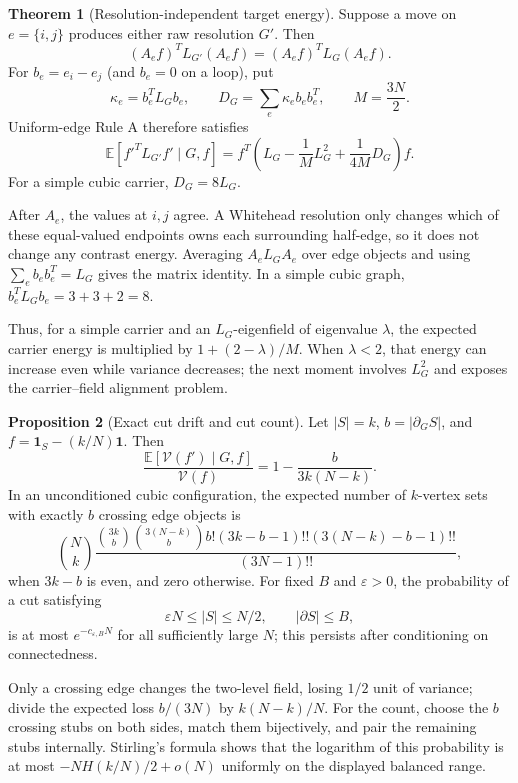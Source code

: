 \documentclass[11pt]{article}
\makeatletter
\newcommand{\E}{\mathbb E}
\newcommand{\V}{\mathcal V}
\newcommand{\one}{\mathbf 1}
\theoremstyle{definition}
\newtheorem{theorem}{Theorem}
\newtheorem{proposition}[theorem]{Proposition}
\renewenvironment{proof}[1][\proofname]{\par
  \pushQED{\qed}%
  \normalfont \topsep6\p@\@plus6\p@\relax
  \trivlist
  \item[\hskip\labelsep\bfseries #1\@addpunct{.}]\ignorespaces
}{%
  \popQED\endtrivlist\@endpefalse
}
\makeatother
\begin{document}
\begin{theorem}[Resolution-independent target energy]
Suppose a move on $e=\{i,j\}$ produces either raw resolution $G'$.  Then
\[
    (A_ef)^TL_{G'}(A_ef)=(A_ef)^TL_G(A_ef).
\]
For $b_e=e_i-e_j$ (and $b_e=0$ on a loop), put
\[
 \kappa_e=b_e^TL_Gb_e,\qquad
 D_G=\sum_e\kappa_e b_eb_e^T,\qquad M=\frac{3N}{2}.
\]
Uniform-edge Rule A therefore satisfies
\[
 \E[f'^TL_{G'}f'\mid G,f]
 =f^T\left(L_G-\frac1M L_G^2+\frac1{4M}D_G\right)f.
\]
For a simple cubic carrier, $D_G=8L_G$.
\end{theorem}

\begin{proof}
After $A_e$, the values at $i,j$ agree.  A Whitehead resolution only changes
which of these equal-valued endpoints owns each surrounding half-edge, so it
does not change any contrast energy.  Averaging $A_eL_GA_e$ over edge objects
and using $\sum_e b_eb_e^T=L_G$ gives the matrix identity.  In a simple cubic
graph, $b_e^TL_Gb_e=3+3+2=8$.
\end{proof}

Thus, for a simple carrier and an $L_G$-eigenfield of eigenvalue $\lambda$,
the expected carrier energy is multiplied by $1+(2-\lambda)/M$.  When
$\lambda<2$, that energy can increase even while variance decreases; the next
moment involves $L_G^2$ and exposes the carrier--field alignment problem.

\begin{proposition}[Exact cut drift and cut count]
Let $|S|=k$, $b=|\partial_GS|$, and
$f=\one_S-(k/N)\one$.  Then
\[
 \frac{\E[\V(f')\mid G,f]}{\V(f)}
 =1-\frac{b}{3k(N-k)}.
\]
In an unconditioned cubic configuration, the expected number of $k$-vertex
sets with exactly $b$ crossing edge objects is
\[
 \binom Nk
 \frac{\binom{3k}{b}\binom{3(N-k)}{b}b!
 (3k-b-1)!!(3(N-k)-b-1)!!}{(3N-1)!!},
\]
when $3k-b$ is even, and zero otherwise.  For fixed $B$ and
$\varepsilon>0$, the probability of a cut satisfying
\[
 \varepsilon N\le |S|\le N/2,\qquad |\partial S|\le B,
\]
is at most $e^{-c_{\varepsilon,B}N}$ for all sufficiently large $N$; this
persists after conditioning on connectedness.
\end{proposition}

\begin{proof}
Only a crossing edge changes the two-level field, losing $1/2$ unit of
variance; divide the expected loss $b/(3N)$ by $k(N-k)/N$.  For the count,
choose the $b$ crossing stubs on both sides, match them bijectively, and pair
the remaining stubs internally.  Stirling's formula shows that the logarithm
of this probability is at most $-NH(k/N)/2+o(N)$ uniformly on the displayed
balanced range.
\end{proof}
\end{document}
